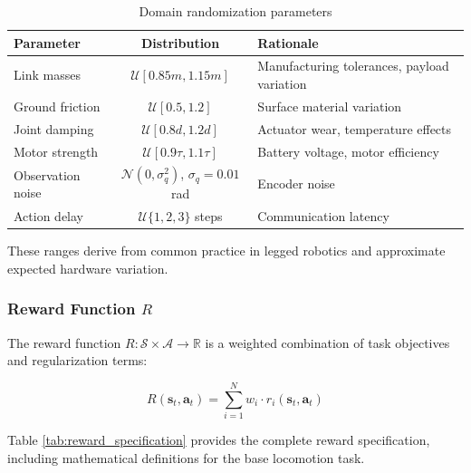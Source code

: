 \documentclass[12pt,a4paper]{article}
\begin{document}
\begin{table}[H]
\centering
\caption{Domain randomization parameters}
\label{tab:domain_randomization}
\footnotesize
\begin{tabular}{l|c|l}
\toprule
\textbf{Parameter} & \textbf{Distribution} & \textbf{Rationale} \\
\midrule
Link masses & $\mathcal{U}[0.85m, 1.15m]$ & Manufacturing tolerances, payload variation \\
Ground friction & $\mathcal{U}[0.5, 1.2]$ & Surface material variation \\
Joint damping & $\mathcal{U}[0.8d, 1.2d]$ & Actuator wear, temperature effects \\
Motor strength & $\mathcal{U}[0.9\tau, 1.1\tau]$ & Battery voltage, motor efficiency \\
Observation noise & $\mathcal{N}(0, \sigma_q^2)$, $\sigma_q = 0.01$ rad & Encoder noise \\
Action delay & $\mathcal{U}\{1, 2, 3\}$ steps & Communication latency \\
\bottomrule
\end{tabular}
\end{table}

These ranges derive from common practice in legged robotics \parencite{gu2024humanoidgym, hwangbo2019learning} and approximate expected hardware variation.

\subsubsection{Reward Function $R$}

The reward function $R: \mathcal{S} \times \mathcal{A} \rightarrow \mathbb{R}$ is a weighted combination of task objectives and regularization terms:

\begin{equation}
R(\mathbf{s}_t, \mathbf{a}_t) = \sum_{i=1}^{N} w_i \cdot r_i(\mathbf{s}_t, \mathbf{a}_t)
\label{eq:reward_function}
\end{equation}

Table \ref{tab:reward_specification} provides the complete reward specification, including mathematical definitions for the base locomotion task.
\end{document}
